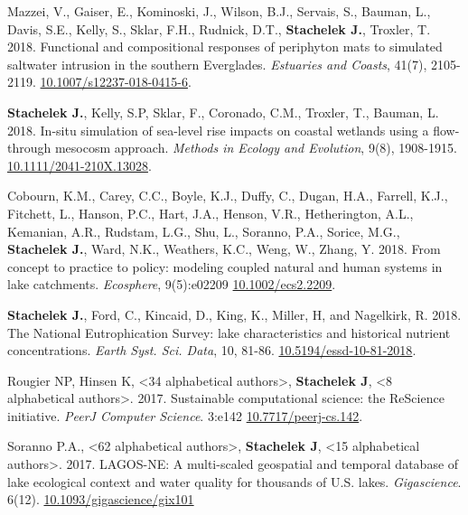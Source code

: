 \documentclass[11pt]{article}
\makeatletter
\newlength{\bibhang}
\newlength{\bibsep}
 {\@listi \global\bibsep\itemsep \global\advance\bibsep by\parsep}
\newenvironment{bibenum*}
  {\renewcommand\labelenumi{[\theenumi]}%
   \etaremune[
     topsep=0pt,
     itemsep=\bibsep,
     parsep=0pt,partopsep=0pt,
     itemindent=-\bibhang,
     leftmargin=0.8em
     ]
     }
  {\endetaremune}
\makeatother
\begin{document}
\begin{bibenum*}
    \item Mazzei, V., Gaiser, E., Kominoski, J., Wilson, B.J., Servais, S., Bauman, L., Davis, S.E., Kelly, S., Sklar, F.H., Rudnick, D.T., \textbf{Stachelek J.}, Troxler, T. 2018. Functional and compositional responses of periphyton mats to simulated saltwater intrusion in the southern Everglades. \emph{Estuaries and Coasts}, 41(7), 2105-2119. \href{https://doi.org/10.1007/s12237-018-0415-6}{10.1007/s12237-018-0415-6}.

    \item \textbf{Stachelek J.}, Kelly, S.P, Sklar, F., Coronado, C.M., Troxler, T., Bauman, L. 2018. In-situ simulation of sea-level rise impacts on coastal wetlands using a flow-through mesocosm approach. \emph{Methods in Ecology and Evolution}, 9(8), 1908-1915. \href{https://doi.org/10.1111/2041-210X.13028}{10.1111/2041-210X.13028}.

    \item Cobourn, K.M., Carey, C.C., Boyle, K.J., Duffy, C., Dugan, H.A., Farrell, K.J., Fitchett, L., Hanson, P.C., Hart, J.A., Henson, V.R., Hetherington, A.L., Kemanian, A.R., Rudstam, L.G., Shu, L., Soranno, P.A., Sorice, M.G., \textbf{Stachelek J.}, Ward, N.K., Weathers, K.C., Weng, W., Zhang, Y. 2018. From concept to practice to policy: modeling coupled natural and human systems in lake catchments. \emph{Ecosphere}, 9(5):e02209 \href{https://doi.org/10.1002/ecs2.2209}{10.1002/ecs2.2209}.

    \item \textbf{Stachelek J.}, Ford, C., Kincaid, D., King, K., Miller, H, and Nagelkirk, R. 2018. The National Eutrophication Survey: lake characteristics and historical nutrient concentrations. \emph{Earth Syst. Sci. Data}, 10, 81-86. \href{https://doi.org/10.5194/essd-10-81-2018}{10.5194/essd-10-81-2018}.

    \item Rougier NP, Hinsen K, <34 alphabetical authors>, \textbf{Stachelek J}, <8 alphabetical authors>. 2017. Sustainable computational science: the ReScience initiative. \emph{PeerJ Computer Science}. 3:e142 \href{https://doi.org/10.7717/peerj-cs.142}{10.7717/peerj-cs.142}.

    \item Soranno P.A., <62 alphabetical authors>, \textbf{Stachelek J}, <15 alphabetical authors>. 2017. LAGOS-NE: A multi-scaled geospatial and temporal database of lake ecological context and water quality for thousands of U.S. lakes. \emph{Gigascience}. 6(12). \href{https://doi.org/10.1093/gigascience/gix101}{10.1093/gigascience/gix101}


\end{bibenum*}
\end{document}
